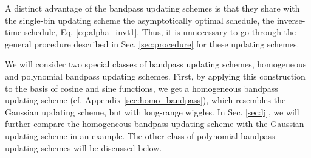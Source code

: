 \documentclass[reprint, superscriptaddress, floatfix]{revtex4-1}
\newcommand{\note}[1]{{\color{DarkGreen}\footnotesize \textsc{Note.} #1}}
\begin{document}
A distinct advantage of the bandpass updating schemes
is that they share with the single-bin updating scheme
the asymptotically optimal schedule,
the inverse-time schedule, Eq. \eqref{eq:alpha_invt1}.
%
Thus, it is unnecessary to go through the general procedure
described in Sec. \ref{sec:procedure}
for these updating schemes.

We will consider two special classes of bandpass updating schemes,
homogeneous and polynomial bandpass updating schemes.
%
%
First,
by applying this construction to the basis of cosine and sine functions,
we get a homogeneous bandpass updating scheme
(cf. Appendix \ref{sec:homo_bandpass}),
which resembles the Gaussian updating scheme,
but with long-range wiggles.
%
In Sec. \ref{sec:lj},
we will further compare
the homogeneous bandpass updating scheme
with the Gaussian updating scheme
in an example.
%
%
%
The other class of polynomial bandpass updating schemes will be discussed below.

\end{document}
